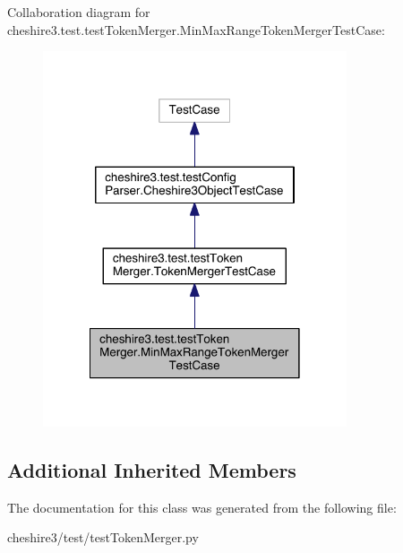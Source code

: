 Collaboration diagram for cheshire3.\-test.\-test\-Token\-Merger.\-Min\-Max\-Range\-Token\-Merger\-Test\-Case\-:
\nopagebreak
\begin{figure}[H]
\begin{center}
\leavevmode
\includegraphics[width=254pt]{classcheshire3_1_1test_1_1test_token_merger_1_1_min_max_range_token_merger_test_case__coll__graph}
\end{center}
\end{figure}
\subsection*{Additional Inherited Members}


The documentation for this class was generated from the following file\-:\begin{DoxyCompactItemize}
\item 
cheshire3/test/test\-Token\-Merger.\-py\end{DoxyCompactItemize}
